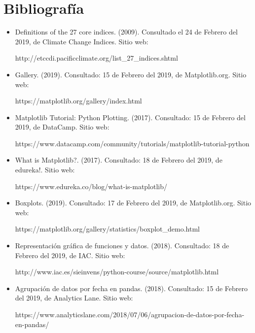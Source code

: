 \documentclass{article}
\begin{document}
\section{Bibliografía}
\begin{itemize}
    \item Definitions of the 27 core indices. (2009). Consultado el 24 de Febrero del 2019, de Climate Change Indices. Sitio web: 
    
    http://etccdi.pacificclimate.org/list\_27\_indices.shtml

    \item Gallery. (2019). Consultado: 15 de Febrero del 2019, de Matplotlib.org. Sitio web:
    
    https://matplotlib.org/gallery/index.html
    
    \item Matplotlib Tutorial: Python Plotting. (2017). Consultado: 15 de Febrero del 2019, de DataCamp. Sitio web: 
    
    https://www.datacamp.com/community/tutorials/matplotlib-tutorial-python
    
    \item What is Matplotlib?. (2017). Consultado: 18 de Febrero del 2019, de edureka!. Sitio web:
    
    https://www.edureka.co/blog/what-is-matplotlib/
    
    \item Boxplots. (2019). Consultado: 17 de Febrero del 2019, de Matplotlib.org. Sitio web:
    
    https://matplotlib.org/gallery/statistics/boxplot\_demo.html
    
    \item Representación gráfica de funciones y datos. (2018). Consultado: 18 de Febrero del 2019, de IAC. Sitio web: 
    
    http://www.iac.es/sieinvens/python-course/source/matplotlib.html
    
    \item Agrupación de datos por fecha en pandas. (2018). Consultado: 15 de Febrero del 2019, de Analytics Lane. Sitio web:
    
    https://www.analyticslane.com/2018/07/06/agrupacion-de-datos-por-fecha-en-pandas/
    
\end{itemize}
\end{document}
